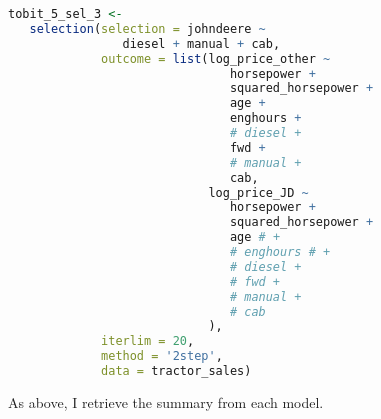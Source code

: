 \documentclass[11pt]{paper}
\begin{document}
\begin{lstlisting}[language=R]
tobit_5_sel_3 <-
   selection(selection = johndeere ~
                diesel + manual + cab,
             outcome = list(log_price_other ~
                               horsepower +
                               squared_horsepower +
                               age +
                               enghours +
                               # diesel +
                               fwd +
                               # manual +
                               cab,
                            log_price_JD ~
                               horsepower +
                               squared_horsepower +
                               age # +
                               # enghours # +
                               # diesel +
                               # fwd +
                               # manual +
                               # cab
                            ),
             iterlim = 20,
             method = '2step',
             data = tractor_sales)

\end{lstlisting}

As above, I retrieve the summary from each model.
\end{document}
